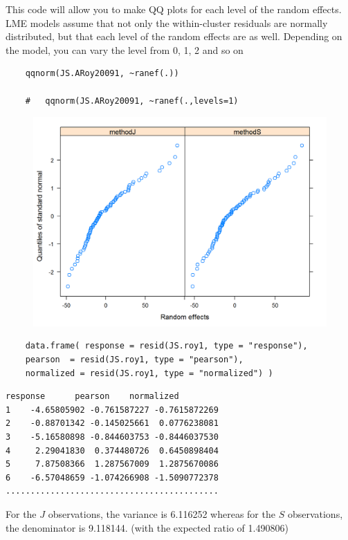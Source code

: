 \documentclass[Main.tex]{subfiles}
\begin{document}
This code will allow you to make QQ plots for each level of the random effects.  LME models assume that not only the within-cluster residuals are normally distributed, but that each level of the random effects are as well. Depending on the model, you can vary the level from 0, 1, 2 and so on
\begin{framed}
	\begin{verbatim}
	qqnorm(JS.ARoy20091, ~ranef(.))
	
	# 	qqnorm(JS.ARoy20091, ~ranef(.,levels=1)
	\end{verbatim}
\end{framed}
\begin{figure}[h!]
	\centering
	\includegraphics[width=0.9\linewidth]{images/ResidPlot2}
	\caption{}
	\label{fig:ResidPlot2}
\end{figure}	


\begin{framed}
	\begin{verbatim}
	data.frame( response = resid(JS.roy1, type = "response"), 
	pearson  = resid(JS.roy1, type = "pearson"), 
	normalized = resid(JS.roy1, type = "normalized") )
	\end{verbatim}
\end{framed}

\begin{verbatim}
response      pearson    normalized
1    -4.65805902 -0.761587227 -0.7615872269
2    -0.88701342 -0.145025661  0.0776238081
3    -5.16580898 -0.844603753 -0.8446037530
4     2.29041830  0.374480726  0.6450898404
5     7.87508366  1.287567009  1.2875670086
6    -6.57048659 -1.074266908 -1.5090772378
...........................................
\end{verbatim}
For the $J$ observations, the variance is 6.116252 whereas for the $S$ observations, the denominator is 9.118144. (with the expected ratio of  1.490806)
\end{document}
